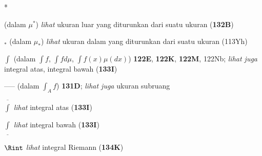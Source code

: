 *
 
 
(dalam $\mu^*$) {\it lihat} ukuran luar yang diturunkan dari suatu ukuran ({\bf 132B})

$_*$ (dalam $\mu_*$) {\it lihat} ukuran dalam yang diturunkan dari suatu ukuran
(113Yh)
















$\int$ (dalam $\int f$, $\int fd\mu$, $\int f(x)\mu(dx)$) {\bf 122E}, {\bf
122K}, {\bf 122M}, 122Nb; 
  {\it lihat juga} integral atas, integral bawah ({\bf 133I})



----- (dalam $\int_Af$) {\bf 131D};  
  {\it lihat juga} ukuran subruang



$\overline{\int}$ {\it lihat} integral atas ({\bf 133I})

$\underline{\int}$ {\it lihat} integral bawah ({\bf 133I})





$\Rint$ {\it lihat} integral Riemann ({\bf 134K})
































































